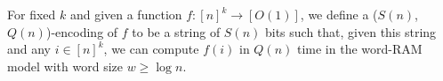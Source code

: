 \begin{definition}[label=def:encoding,restate=DefinitionEncoding]
  For fixed \(k\) and given a function \(f : {[n]}^k \to [O(1)]\), we define
  a (\(S(n)\),\(Q(n)\))-encoding of \(f\) to be a string of \(S(n)\) bits such
  that, given this string and any \(i \in {[n]}^k\), we can compute \(f(i)\)
  in \(Q(n)\) time in the word-RAM model with word size \(w \geq \log
  n\).
\end{definition}
